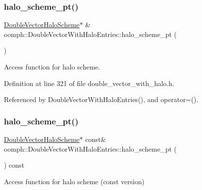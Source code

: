 \subsubsection{\texorpdfstring{halo\+\_\+scheme\+\_\+pt()}{halo\_scheme\_pt()}\hspace{0.1cm}{\footnotesize\ttfamily [1/2]}}
{\footnotesize\ttfamily \hyperlink{classoomph_1_1DoubleVectorHaloScheme}{Double\+Vector\+Halo\+Scheme}$\ast$ \& oomph\+::\+Double\+Vector\+With\+Halo\+Entries\+::halo\+\_\+scheme\+\_\+pt (\begin{DoxyParamCaption}{ }\end{DoxyParamCaption})\hspace{0.3cm}{\ttfamily [inline]}}



Access function for halo scheme. 



Definition at line 321 of file double\+\_\+vector\+\_\+with\+\_\+halo.\+h.



Referenced by Double\+Vector\+With\+Halo\+Entries(), and operator=().

\mbox{\label{classoomph_1_1DoubleVectorWithHaloEntries_a4c4d6f14ca068dc33f318cbdde6b34c5}} 
\subsubsection{\texorpdfstring{halo\+\_\+scheme\+\_\+pt()}{halo\_scheme\_pt()}\hspace{0.1cm}{\footnotesize\ttfamily [2/2]}}
{\footnotesize\ttfamily \hyperlink{classoomph_1_1DoubleVectorHaloScheme}{Double\+Vector\+Halo\+Scheme}$\ast$ const\& oomph\+::\+Double\+Vector\+With\+Halo\+Entries\+::halo\+\_\+scheme\+\_\+pt (\begin{DoxyParamCaption}{ }\end{DoxyParamCaption}) const\hspace{0.3cm}{\ttfamily [inline]}}



Access function for halo scheme (const version) 



